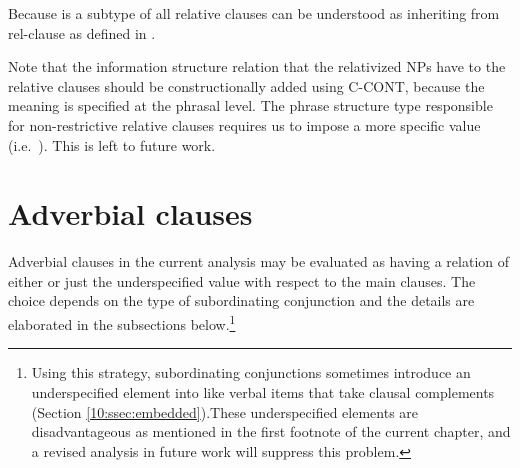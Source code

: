 


Because  is a subtype of  all
relative clauses can be understood as inheriting from rel-clause as
defined in .




\noindent Note that the information structure relation that the
relativized NPs have to the relative clauses should be
constructionally added using C-CONT, because the meaning is specified
at the phrasal level.  The phrase structure type responsible for
non-restrictive relative clauses requires us to impose a more specific
value (i.e.\ ). This is left to future work.



\section{Adverbial clauses}
\label{10:ssec:adjunct}

Adverbial clauses in the current analysis may be evaluated as having a
relation of either  or just the underspecified value
 with respect to the main clauses.  The choice depends
on the type of subordinating conjunction and the details are
elaborated in the subsections below.\footnote{Using this strategy,
  subordinating conjunctions sometimes introduce an underspecified
   element into  like verbal items that take
  clausal complements (Section \ref{10:ssec:embedded}).These underspecified
  elements are disadvantageous as mentioned in the first footnote of
  the current chapter, and a revised analysis in future work will
  suppress this problem.}


